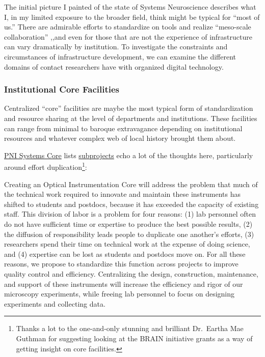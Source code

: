 \documentclass{article}
\begin{document}
The initial picture I painted of the state of Systems Neuroscience
describes what I, in my limited exposure to the broader field, think
might be typical for ``most of us.'' There are admirable efforts to
standardize on tools and realize ``meso-scale collaboration'' \cite{mainenBetterWayCrack2016},,and even for those that are not the
experience of infrastructure can vary dramatically by institution. To
investigate the constraints and circumstances of infrastructure
development, we can examine the different domains of contact researchers
have with organized digital technology.

\hypertarget{institutional-core-facilities}{%
\subsubsection{Institutional Core
Facilities}\label{institutional-core-facilities}}

Centralized ``core'' facilities are maybe the most typical form of
standardization and resource sharing at the level of departments and
institutions. These facilities can range from minimal to baroque
extravagance depending on institutional resources and whatever complex
web of local history brought them about.

\href{https://projectreporter.nih.gov/project_info_details.cfm?aid=9444124}{PNI
Systems Core} lists
\href{https://projectreporter.nih.gov/project_info_subprojects.cfm?aid=9444124\&icde=0}{subprojects}
echo a lot of the thoughts here, particularly around effort
duplication\footnote{Thanks a lot to the one-and-only stunning and
  brilliant Dr.~Eartha Mae Guthman for suggesting looking at the BRAIN
  initiative grants as a way of getting insight on core facilities.}:

\begin{leftbar}
Creating an Optical Instrumentation Core will address the problem that
much of the technical work required to innovate and maintain these
instruments has shifted to students and postdocs, because it has
exceeded the capacity of existing staff. This division of labor is a
problem for four reasons: (1) lab personnel often do not have sufficient
time or expertise to produce the best possible results, (2) the
diffusion of responsibility leads people to duplicate one another's
efforts, (3) researchers spend their time on technical work at the
expense of doing science, and (4) expertise can be lost as students and
postdocs move on. For all these reasons, we propose to standardize this
function across projects to improve quality control and efficiency.
Centralizing the design, construction, maintenance, and support of these
instruments will increase the efficiency and rigor of our microscopy
experiments, while freeing lab personnel to focus on designing
experiments and collecting data.
\end{leftbar}
\end{document}
